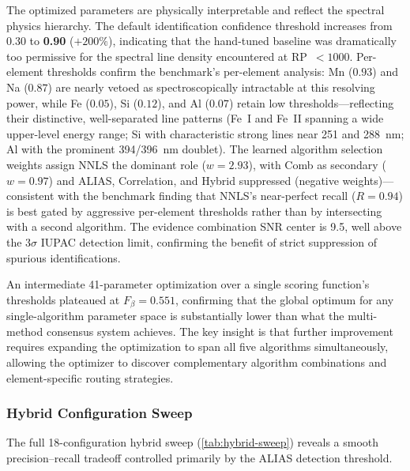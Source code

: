 The optimized parameters are physically interpretable and reflect the spectral physics hierarchy.
The default identification confidence threshold increases from 0.30 to \textbf{0.90} ($+200\%$), indicating that the hand-tuned baseline was dramatically too permissive for the spectral line density encountered at RP~$< 1000$.
Per-element thresholds confirm the benchmark's per-element analysis: Mn ($0.93$) and Na ($0.87$) are nearly vetoed as spectroscopically intractable at this resolving power, while Fe ($0.05$), Si ($0.12$), and Al ($0.07$) retain low thresholds---reflecting their distinctive, well-separated line patterns (Fe~I and Fe~II spanning a wide upper-level energy range; Si with characteristic strong lines near 251 and 288~nm; Al with the prominent 394/396~nm doublet).
The learned algorithm selection weights assign NNLS the dominant role ($w = 2.93$), with Comb as secondary ($w = 0.97$) and ALIAS, Correlation, and Hybrid suppressed (negative weights)---consistent with the benchmark finding that NNLS's near-perfect recall ($R = 0.94$) is best gated by aggressive per-element thresholds rather than by intersecting with a second algorithm.
The evidence combination SNR center is 9.5, well above the $3\sigma$ IUPAC detection limit, confirming the benefit of strict suppression of spurious identifications.

An intermediate 41-parameter optimization over a single scoring function's thresholds plateaued at $F_{\beta} = 0.551$, confirming that the global optimum for any single-algorithm parameter space is substantially lower than what the multi-method consensus system achieves.
The key insight is that further improvement requires expanding the optimization to span all five algorithms simultaneously, allowing the optimizer to discover complementary algorithm combinations and element-specific routing strategies.

\subsubsection{Hybrid Configuration Sweep}
\label{sec:results-hybrid-sweep}

The full 18-configuration hybrid sweep (\cref{tab:hybrid-sweep}) reveals a smooth precision--recall tradeoff controlled primarily by the ALIAS detection threshold.

